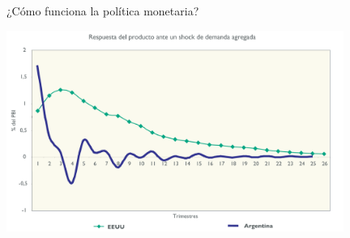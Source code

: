 \documentclass{beamer}
\begin{document}

\begin{frame}{¿Cómo funciona la política monetaria?}
    
    \centering\includegraphics[width=11cm]{Slides Principios de Economia/P81.png}\

\end{frame}
\end{document}
